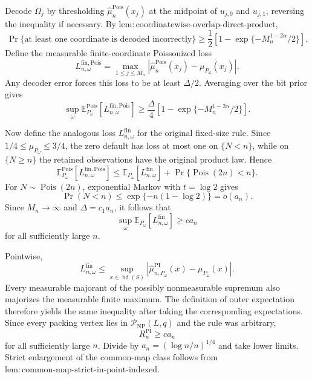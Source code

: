 Decode \(\Omega_j\) by thresholding \(\widehat\mu_n^{\mathrm{Pois}}(x_j)\) at the midpoint of \(u_{j,0}\) and \(u_{j,1}\), reversing the inequality if necessary.  By \(\mathrm{lem:coordinatewise\text{-}overlap\text{-}direct\text{-}product}\),
\[
 \Pr\{\text{at least one coordinate is decoded incorrectly}\}
 \geq\frac12\left[1-\exp\{-M_n^{1-2\alpha}/2\}\right].
\]
Define the measurable finite-coordinate Poissonized loss
\[
 L_{n,\omega}^{\mathrm{fin,Pois}}
 =\max_{1\leq j\leq M_n}
 \left|\widehat\mu_n^{\mathrm{Pois}}(x_j)-\mu_{P_\omega}(x_j)\right|.
\]
Any decoder error forces this loss to be at least \(\Delta/2\).  Averaging over the bit prior gives
\[
 \sup_\omega\mathbb E_{P_\omega}^{\mathrm{Pois}}
 [L_{n,\omega}^{\mathrm{fin,Pois}}]
 \geq\frac\Delta4
 \left[1-\exp\{-M_n^{1-2\alpha}/2\}\right].
\]

Now define the analogous loss \(L_{n,\omega}^{\mathrm{fin}}\) for the original fixed-size rule.  Since \(1/4\leq\mu_{P_\omega}\leq3/4\), the zero default has loss at most one on \(\{N<n\}\), while on \(\{N\geq n\}\) the retained observations have the original product law.  Hence
\[
 \mathbb E_{P_\omega}^{\mathrm{Pois}}[L_{n,\omega}^{\mathrm{fin,Pois}}]
 \leq \mathbb E_{P_\omega}[L_{n,\omega}^{\mathrm{fin}}]
 +\Pr\{\operatorname{Pois}(2n)<n\}.
\]
For \(N\sim\operatorname{Pois}(2n)\), exponential Markov with \(t=\log2\) gives
\[
 \Pr(N<n)\leq\exp\{-n(1-\log2)\}=o(a_n).
\]
Since \(M_n\to\infty\) and \(\Delta=c_1a_n\), it follows that
\[
 \sup_\omega\mathbb E_{P_\omega}[L_{n,\omega}^{\mathrm{fin}}]\geq ca_n
\]
for all sufficiently large \(n\).

Pointwise,
\[
 L_{n,\omega}^{\mathrm{fin}}
 \leq\sup_{x\in\operatorname{bd}(S)}
 \left|\widehat\mu_{n,P_\omega}^{\mathrm{PI}}(x)-\mu_{P_\omega}(x)\right|.
\]
Every measurable majorant of the possibly nonmeasurable supremum also majorizes the measurable finite maximum.  The definition of outer expectation therefore yields the same inequality after taking the corresponding expectations.  Since every packing vertex lies in \(\mathcal P_{\mathrm{NP}}(L,q)\) and the rule was arbitrary,
\[
 R_n^{\mathrm{PI}}\geq ca_n
\]
for all sufficiently large \(n\).  Divide by \(a_n=(\log n/n)^{1/4}\) and take lower limits.  Strict enlargement of the common-map class follows from \(\mathrm{lem:common\text{-}map\text{-}strict\text{-}in\text{-}point\text{-}indexed}\).